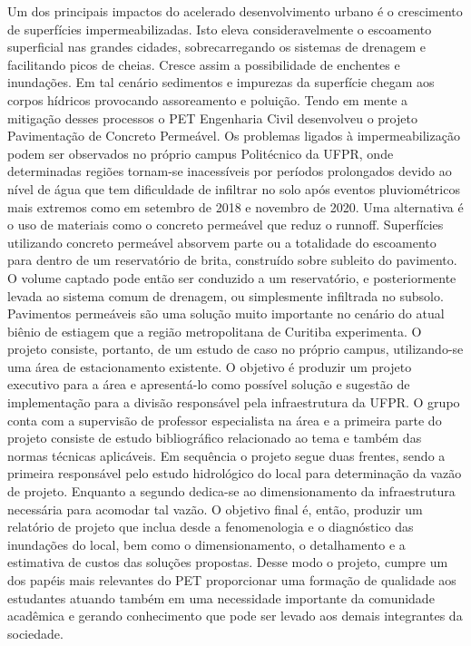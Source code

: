 Um dos principais impactos do acelerado desenvolvimento urbano é o crescimento de superfícies 
impermeabilizadas. Isto eleva consideravelmente o escoamento superficial nas grandes cidades, 
sobrecarregando os sistemas de drenagem e facilitando picos de cheias. Cresce assim a 
possibilidade de enchentes e inundações. Em tal cenário sedimentos e impurezas da superfície 
chegam aos corpos hídricos provocando assoreamento e poluição. Tendo em mente a mitigação 
desses processos o PET Engenharia Civil desenvolveu o projeto Pavimentação de Concreto 
Permeável. Os problemas ligados à impermeabilização podem ser observados no próprio campus 
Politécnico da UFPR, onde determinadas regiões tornam-se inacessíveis por períodos prolongados 
devido ao nível de água que tem dificuldade de infiltrar no solo após eventos pluviométricos mais 
extremos como em setembro de 2018 e novembro de 2020. Uma alternativa é o uso de materiais 
como o concreto permeável que reduz o runnoff. Superfícies utilizando concreto permeável 
absorvem parte ou a totalidade do escoamento para dentro de um reservatório de brita, construído 
sobre subleito do pavimento. O volume captado pode então ser conduzido a um reservatório, e 
posteriormente levada ao sistema comum de drenagem, ou simplesmente infiltrada no subsolo. 
Pavimentos permeáveis são uma solução muito importante no cenário do atual biênio de estiagem 
que a região metropolitana de Curitiba experimenta. O projeto consiste, portanto, de um estudo de 
caso no próprio campus, utilizando-se uma área de estacionamento existente. O objetivo é produzir 
um projeto executivo para a área e apresentá-lo como possível solução e sugestão de 
implementação para a divisão responsável pela infraestrutura da UFPR. O grupo conta com a 
supervisão de professor especialista na área e a primeira parte do projeto consiste de estudo 
bibliográfico relacionado ao tema e também das normas técnicas aplicáveis. Em sequência o 
projeto segue duas frentes, sendo a primeira responsável pelo estudo hidrológico do local para 
determinação da vazão de projeto. Enquanto a segundo dedica-se ao dimensionamento da 
infraestrutura necessária para acomodar tal vazão. O objetivo final é, então, produzir um relatório 
de projeto que inclua desde a fenomenologia e o diagnóstico das inundações do local, bem como 
o dimensionamento, o detalhamento e a estimativa de custos das soluções propostas. Desse modo 
o projeto, cumpre um dos papéis mais relevantes do PET proporcionar uma formação de qualidade 
aos estudantes atuando também em uma necessidade importante da comunidade acadêmica e 
gerando conhecimento que pode ser levado aos demais integrantes da sociedade.


